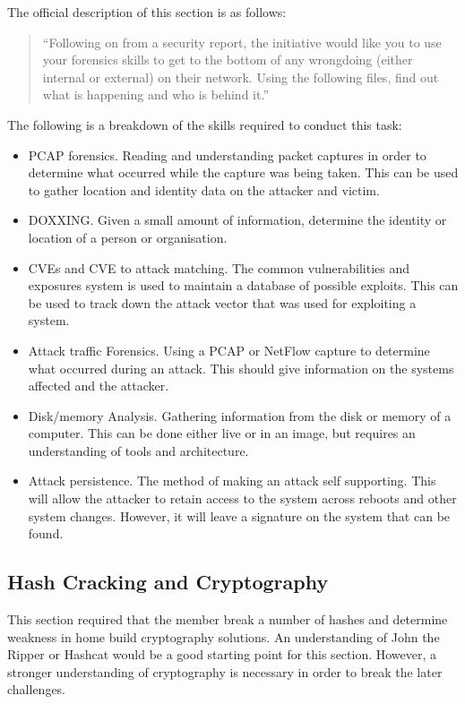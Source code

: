\documentclass[a4paper,11pt]{report}
\begin{document}
			The official description of this section is as follows:
			\begin{quote}
				``Following on from a security report, the initiative would like you to use your forensics skills to get to the bottom of any wrongdoing (either internal or external) on their network. Using the following files, find out what is happening and who is behind it.'' 
			\end{quote}
			The following is a breakdown of the skills required to conduct this task:
			\begin{itemize}
				\item PCAP forensics.
					Reading and understanding packet captures in order to determine what occurred while the capture was being taken. 
					This can be used to gather location and identity data on the attacker and victim. 
				\item DOXXING. 
					Given a small amount of information, determine the identity or location of a person or organisation.
				\item CVEs and CVE to attack matching.
					The common vulnerabilities and exposures system is used to maintain a database of possible exploits. 
					This can be used to track down the attack vector that was used for exploiting a system. 
				\item Attack traffic Forensics.
					Using a PCAP or NetFlow capture to determine what occurred during an attack. 
					This should give information on the systems affected and the attacker. 
				\item Disk/memory Analysis.
					Gathering information from the disk or memory of a computer. 
					This can be done either live or in an image, but requires an understanding of tools and architecture.
				\item Attack persistence.
					The method of making an attack self supporting. 
					This will allow the attacker to retain access to the system across reboots and other system changes. 
					However, it will leave a signature on the system that can be found. 
			\end{itemize}
		\subsection{Hash Cracking and Cryptography}
			This section required that the member break a number of hashes and determine weakness in home build cryptography solutions. 
			An understanding of John the Ripper or Hashcat would be a good starting point for this section. 
			However, a stronger understanding of cryptography is necessary in order to break the later challenges. 
			
\end{document}
